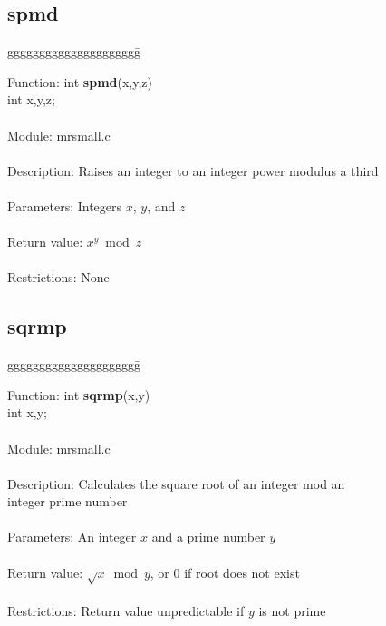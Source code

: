 \subsection{spmd}

\begin{tabbing}
ggggggggggggggggggggg\= \kill

      Function:      \>int {\bf spmd}(x,y,z) \\
                     \>int x,y,z; \\
      \ \\
      Module:        \>mrsmall.c \\
      \ \\
      Description:   \>Raises an integer to an integer power modulus a third  \\
      \ \\
      Parameters:    \>Integers $x$, $y$, and $z$  \\
      \ \\
      Return value:  \>$x^y \bmod z$ \\
      \ \\
      Restrictions:  \>None \\

\end{tabbing}

\pagebreak

\subsection{sqrmp}

\begin{tabbing}
ggggggggggggggggggggg\= \kill

      Function:      \>int {\bf sqrmp}(x,y) \\
                     \>int x,y; \\
      \ \\
      Module:        \>mrsmall.c \\
      \ \\
      Description:   \>Calculates the square root of an integer mod an \\
                     \>integer prime number  \\
      \ \\
      Parameters:    \>An integer $x$ and a prime number $y$   \\
      \ \\
      Return value:  \>$\sqrt{x} \bmod y$, or 0 if root does not exist \\
      \ \\
      Restrictions:  \>Return value unpredictable if $y$ is not prime \\

\end{tabbing}
